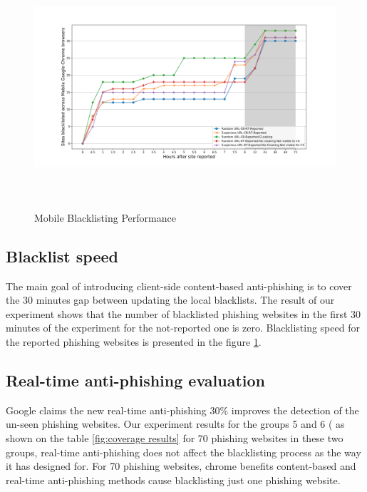 \documentclass[letterpaper,twocolumn,10pt]{article}
\begin{document}
\begin{figure}[t]
  \includegraphics[width=\textwidth,height=9cm]{Mobile-Blacklists-Speed.png}
  \caption{Mobile Blacklisting Performance }
  \label{Blacklisting speed results}
\end{figure}

\subsection{Blacklist speed}
The main goal of introducing client-side content-based anti-phishing is to cover the 30 minutes gap between updating the local blacklists. The result of our experiment shows that the number of blacklisted phishing websites in the first 30 minutes of the experiment for the not-reported one is zero.
Blacklisting speed for the reported phishing websites is presented in the figure \ref{Blacklisting speed results}. 

\subsection{Real-time anti-phishing evaluation}

Google claims the new real-time anti-phishing 30\%  improves the detection of the un-seen phishing websites. Our experiment results for the groups 5 and 6 ( as shown on the table \ref{fig:coverage results} for 70 phishing websites in these two groups, real-time anti-phishing does not affect the blacklisting process as the way it has designed for. For 70 phishing websites, chrome benefits content-based and real-time anti-phishing methods cause blacklisting just one phishing website.
\end{document}
